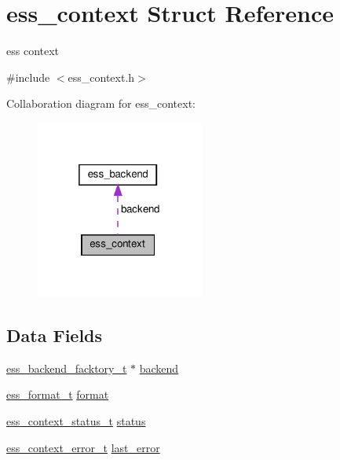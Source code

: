 \hypertarget{structess__context}{}\section{ess\+\_\+context Struct Reference}
\label{structess__context}


ess context  




{\ttfamily \#include $<$ess\+\_\+context.\+h$>$}



Collaboration diagram for ess\+\_\+context\+:\nopagebreak
\begin{figure}[H]
\begin{center}
\leavevmode
\includegraphics[width=157pt]{dd/d8d/structess__context__coll__graph}
\end{center}
\end{figure}
\subsection*{Data Fields}
\begin{DoxyCompactItemize}
\item 
\hyperlink{ess__backend_8h_ab1487f8c501b38b66796d0fbecb7ed7b}{ess\+\_\+backend\+\_\+facktory\+\_\+t} $\ast$ \hyperlink{structess__context_a1fdb06c6d95c1f47d692da94aaf8af17}{backend}
\item 
\hyperlink{ess__format_8h_ab03f24cb5d42f4448f713bf1ec178163}{ess\+\_\+format\+\_\+t} \hyperlink{structess__context_abb4395d1c05d3bbc2e1d011507ddd19b}{format}
\item 
\hyperlink{ess__context_8h_adb5314cbbcb2bed6fc8b770d8ef3257c}{ess\+\_\+context\+\_\+status\+\_\+t} \hyperlink{structess__context_a6151ccede5aaf683375710d2677c74c7}{status}
\item 
\hyperlink{ess__context_8h_acc807999e4f53d1867abf8a0ac682f33}{ess\+\_\+context\+\_\+error\+\_\+t} \hyperlink{structess__context_a7a8b9bb3789092b56f6a6623888fcc3d}{last\+\_\+error}
\end{DoxyCompactItemize}


